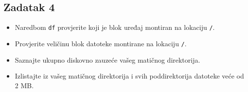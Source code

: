 \documentclass[12pt,a4paper]{article}
\newcommand{\shell}[1]{\texttt{#1}}
\begin{document}
	\subsection*{Zadatak 4}
	\begin{itemize}
		\item Naredbom \shell{df} provjerite koji je blok uređaj montiran na lokaciju \shell{/}.
		\item Provjerite veličinu blok datoteke montirane na lokaciju \shell{/}.
		\item Saznajte ukupno diskovno zauzeće vašeg matičnog direktorija.
		\item Izlistajte iz vašeg matičnog direktorija i svih poddirektorija datoteke veće od 2 MB. 
	\end{itemize}
\end{document}
